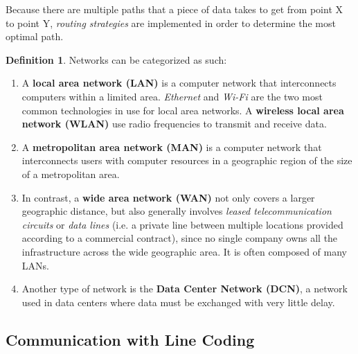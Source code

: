 \documentclass[a4paper, 12pt]{report}
\theoremstyle{remark}
\theoremstyle{definition}
\newtheorem{definition}{Definition}[section]
\begin{document}
Because there are multiple paths that a piece of data takes to get from point X to point Y, \textit{routing strategies} are implemented in order to determine the most optimal path.  

\begin{definition}
Networks can be categorized as such: 
\begin{enumerate}
    \item A \textbf{local area network (LAN)} is a computer network that interconnects computers within a limited area. \textit{Ethernet} and \textit{Wi-Fi} are the two most common technologies in use for local area networks. A \textbf{wireless local area network (WLAN)} use radio frequencies to transmit and receive data. 
    \item A \textbf{metropolitan area network (MAN)} is a computer network that interconnects users with computer resources in a geographic region of the size of a metropolitan area. 
    \item In contrast, a \textbf{wide area network (WAN)} not only covers a larger geographic distance, but also generally involves \textit{leased telecommunication circuits} or \textit{data lines} (i.e. a private line between multiple locations provided according to a commercial contract), since no single company owns all the infrastructure across the wide geographic area. It is often composed of many LANs. 
    \item Another type  of network is the \textbf{Data Center Network (DCN)}, a network used in data centers where data must be exchanged with very little delay.
\end{enumerate}
\end{definition}

\subsection{Communication with Line Coding}
\end{document}
